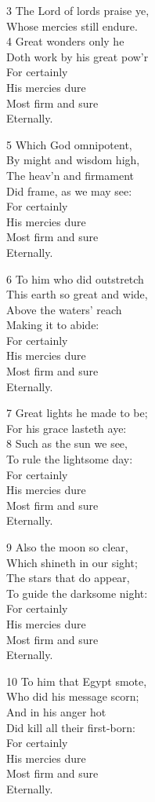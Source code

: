 3 The Lord of lords praise ye,\\
Whose mercies still endure.\\
4 Great wonders only he\\
Doth work by his great pow’r\\
For certainly\\
His mercies dure\\
Most firm and sure\\
Eternally.

5 Which God omnipotent,\\
By might and wisdom high,\\
The heav’n and firmament\\
Did frame, as we may see:\\
For certainly\\
His mercies dure\\
Most firm and sure\\
Eternally.

6 To him who did outstretch\\
This earth so great and wide,\\
Above the waters’ reach\\
Making it to abide:\\
For certainly\\
His mercies dure\\
Most firm and sure\\
Eternally.

7 Great lights he made to be;\\
For his grace lasteth aye:\\
8 Such as the sun we see,\\
To rule the lightsome day:\\
For certainly\\
His mercies dure\\
Most firm and sure\\
Eternally.

9 Also the moon so clear,\\
Which shineth in our sight;\\
The stars that do appear,\\
To guide the darksome night:\\
For certainly\\
His mercies dure\\
Most firm and sure\\
Eternally.

10 To him that Egypt smote,\\
Who did his message scorn;\\
And in his anger hot\\
Did kill all their first-born:\\
For certainly\\
His mercies dure\\
Most firm and sure\\
Eternally.

